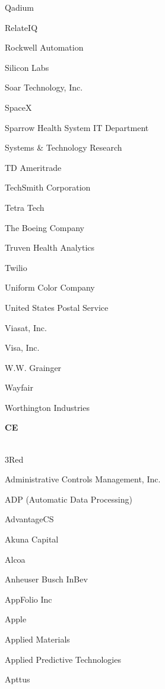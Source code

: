 \documentclass[twoside]{article}
\begin{document}
\begin{center}
\begin{multicols}{5}
\begin{FlushLeft}
\begin{compactitem}
\item Qadium
\item RelateIQ
\item Rockwell Automation
\item Silicon Labs
\item Soar Technology, Inc.
\item SpaceX
\item Sparrow Health System IT Department
\item Systems \& Technology Research
\item TD Ameritrade
\item TechSmith Corporation
\item Tetra Tech
\item The Boeing Company
\item Truven Health Analytics
\item Twilio
\item Uniform Color Company
\item United States Postal Service
\item Viasat, Inc.
\item Visa, Inc.
\item W.W. Grainger
\item Wayfair
\item Worthington Industries
\end{compactitem}
        \end{FlushLeft}
        \vspace{1em}
        {\fontsize{14}{16}\selectfont \bf CE}\\
        \vspace{-1em}
        ~\hrulefill~
        \vspace{-.9em}
        \begin{FlushLeft}
        \begin{compactitem}
        \item 3Red
\item Administrative Controls Management, Inc.
\item ADP (Automatic Data Processing)
\item AdvantageCS
\item Akuna Capital
\item Alcoa
\item Anheuser Busch InBev
\item AppFolio Inc
\item Apple
\item Applied Materials
\item Applied Predictive Technologies
\item Apttus

\end{compactitem}
\end{FlushLeft}
\end{multicols}
\end{center}
\end{document}
